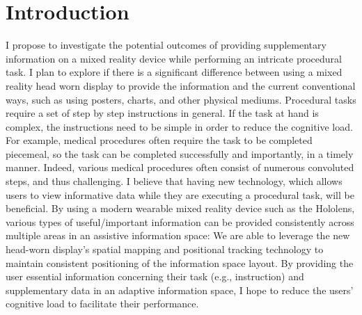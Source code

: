 \section{Introduction}
\label{sec:introduction}
I propose to investigate the potential outcomes of providing supplementary information on a mixed reality device while performing an intricate procedural task. I plan to explore if there is a significant difference between using a mixed reality head worn display to provide the information and the current conventional ways, such as using posters, charts, and other physical mediums. Procedural tasks require a set of step by step instructions in general. If the task at hand is complex, the instructions need to be simple in order to reduce the cognitive load. For example, medical procedures often require the task to be completed piecemeal, so the task can be completed successfully and importantly, in a timely manner. Indeed, various medical procedures often consist of numerous convoluted steps, and thus challenging. I believe that having new technology, which allows users to view informative data while they are executing a procedural task, will be beneficial. By using a modern wearable mixed reality device such as the Hololens, various types of useful/important information can be provided consistently across multiple areas in an assistive information space: We are able to leverage the new head-worn display's spatial mapping and positional tracking technology to maintain consistent positioning of the information space layout. By providing the user essential information concerning their task (e.g., instruction) and supplementary data in an adaptive information space, I hope to reduce the users' cognitive load to facilitate their performance.